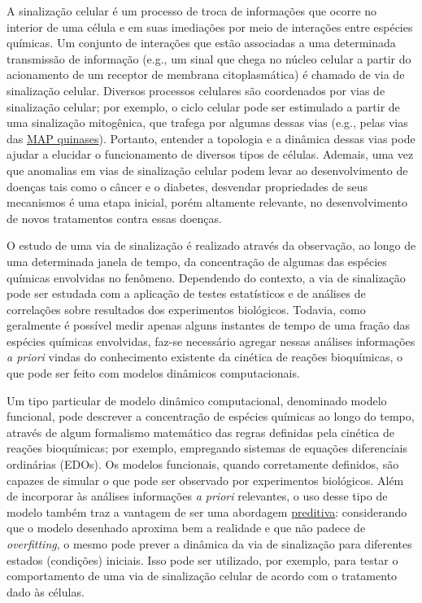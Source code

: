 \documentclass[12pt]{article}
\begin{document}
A sinalização celular é um processo de troca de informações que ocorre no interior de uma célula e em suas imediações por meio de interações entre espécies químicas. Um conjunto de interações que estão associadas a uma determinada transmissão de informação (e.g., um sinal que chega no núcleo celular a partir do acionamento de um receptor de membrana citoplasmática) é chamado de via de sinalização celular.
Diversos processos celulares são coordenados por vias de sinalização celular; por exemplo, o ciclo celular pode ser estimulado a partir de uma sinalização mitogênica, que trafega por algumas dessas vias (e.g., pelas vias das \href{https://en.wikipedia.org/wiki/Mitogen-activated\_protein\_kinase}{MAP quinases}). Portanto, entender a topologia e a dinâmica dessas vias pode ajudar a elucidar o funcionamento de diversos tipos de células. Ademais, uma vez que anomalias em vias de sinalização celular podem levar ao desenvolvimento de doenças tais como o câncer e o diabetes, desvendar propriedades de seus mecanismos é uma etapa inicial, porém altamente relevante, no desenvolvimento de novos tratamentos contra essas doenças.

O estudo de uma via de sinalização é realizado através da observação, ao longo de uma determinada janela de tempo, da concentração de algumas das espécies químicas envolvidas no fenômeno. Dependendo do contexto, a via de sinalização pode ser estudada com a aplicação de testes estatísticos e de análises de correlações sobre resultados dos experimentos biológicos. Todavia, como geralmente é possível medir apenas alguns instantes de tempo de uma fração das espécies químicas envolvidas, faz-se necessário agregar nessas análises informações {\em a priori} vindas do conhecimento existente da cinética de reações bioquímicas, o que pode ser feito com modelos dinâmicos computacionais. 

Um tipo particular de modelo dinâmico computacional, denominado modelo funcional, pode descrever a concentração de espécies químicas ao longo do tempo, através de algum formalismo matemático das regras definidas pela cinética de reações bioquímicas; por exemplo, empregando sistemas de equações diferenciais ordinárias (EDOs). Os modelos funcionais, quando corretamente definidos, são capazes de simular o que pode ser observado por experimentos biológicos. Além de incorporar às análises informações {\em a priori} relevantes, o uso desse tipo de modelo também traz a vantagem de ser uma abordagem \underline{preditiva}: considerando que o modelo desenhado aproxima bem a realidade e que não padece de {\em overfitting}, o mesmo pode prever a dinâmica da via de sinalização para diferentes estados (condições) iniciais. Isso pode ser utilizado, por exemplo, para testar o comportamento de uma via de sinalização celular de acordo com o tratamento dado às células.
\end{document}
